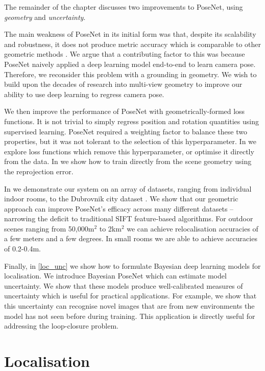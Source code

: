 The remainder of the chapter discusses two improvements to PoseNet, using \textit{geometry} and \textit{uncertainty}.

The main weakness of PoseNet in its initial form was that, despite its scalability and robustness, it does not produce metric accuracy which is comparable to other geometric methods \citep{Sattler14ECCV,svarm2014accurate}. We argue that a contributing factor to this was because PoseNet naively applied a deep learning model end-to-end to learn camera pose. Therefore, we reconsider this problem with a grounding in geometry. We wish to build upon the decades of research into multi-view geometry \citep{hartley2000} to improve our ability to use deep learning to regress camera pose.

We then improve the performance of PoseNet with geometrically-formed loss functions. It is not trivial to simply regress position and rotation quantities using supervised learning. PoseNet required a weighting factor to balance these two properties, but it was not tolerant to the selection of this hyperparameter. In  we explore loss functions which remove this hyperparameter, or optimise it directly from the data. In  we show how to train directly from the scene geometry using the reprojection error.

In  we demonstrate our system on an array of datasets, ranging from individual indoor rooms, to the Dubrovnik city dataset \citep{li2012worldwide}. We show that our geometric approach can improve PoseNet's efficacy across many different datasets -- narrowing the deficit to traditional SIFT feature-based algorithms. For outdoor scenes ranging from 50,000m$^2$ to 2km$^2$ we can achieve relocalisation accuracies of a few meters and a few degrees. In small rooms we are able to achieve accuracies of 0.2-0.4m.

Finally, in \cref{loc_unc} we show how to formulate Bayesian deep learning models for localisation. We introduce Bayesian PoseNet which can estimate model uncertainty. We show that these models produce well-calibrated measures of uncertainty which is useful for practical applications. For example, we show that this uncertainty can recognise novel images that are from new environments the model has not seen before during training. This application is directly useful for addressing the loop-closure problem.






\section{Localisation}

